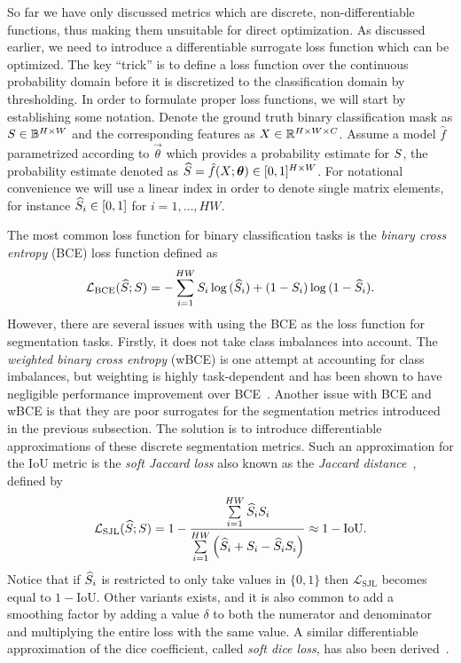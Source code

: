So far we have only discussed metrics which are discrete, non-differentiable functions, thus making them unsuitable for direct optimization.
As discussed earlier, we need to introduce a differentiable surrogate loss function which can be optimized.
The key \enquote{trick} is to define a loss function over the continuous probability domain before it is discretized to the classification domain by thresholding.
In order to formulate proper loss functions, we will start by establishing some notation.
Denote the ground truth binary classification mask as $S \in \mathbb{B}^{H \times W}$ and the corresponding features as $X \in \mathbb{R}^{H \times W \times C}$.
Assume a model $\hat{f}$ parametrized according to $\vec{\theta}$ which provides a probability estimate for $S$, the probability estimate denoted as $\widehat{S} = \hat{f}(X; \boldsymbol{\theta}) \in [0, 1]^{H \times W}$.
For notational convenience we will use a linear index in order to denote single matrix elements, for instance $\widehat{S}_i \in [0, 1]$ for $i = 1, \ldots, HW$.

The most common loss function for binary classification tasks is the \textit{binary cross entropy} (BCE) loss function defined as
%
\begin{equation}
  \mathcal{L}_{\mathrm{BCE}}(\widehat{S}; S)
  =
  - \sum\limits_{i = 1}^{HW}
  S_i \log{(\widehat{S}_i)}
  +
  (1 - S_i) \log{(1 - \widehat{S}_i)}.
  \label{eq:binary-cross-entropy}
\end{equation}
%
However, there are several issues with using the BCE as the loss function for segmentation tasks.
Firstly, it does not take class imbalances into account.
The \textit{weighted binary cross entropy} (wBCE) is one attempt at accounting for class imbalances, but weighting is highly task-dependent and has been shown to have negligible performance improvement over BCE~\cite[p.~98]{soft-losses}.
Another issue with BCE and wBCE is that they are poor surrogates for the segmentation metrics introduced in the previous subsection.
The solution is to introduce differentiable approximations of these discrete segmentation metrics.
Such an approximation for the IoU metric is the \textit{soft Jaccard loss} also known as the \textit{Jaccard distance}~\cite{jaccard-loss-with-equation}, defined by
%
\begin{equation}
  \mathcal{L}_{\mathrm{SJL}}(\predsegraster; \segraster)
  =
  1
  -
  \frac{%
    \sum\limits_{i = 1}^{HW}
    \predsegraster_i \segraster_i
  }{%
    \sum\limits_{i = 1}^{HW} \left(
      \predsegraster_i
      +
      \segraster_i
      -
      \predsegraster_i \segraster_i
    \right)
  }
  \approx
  1 - \mathrm{IoU}.
  \label{eq:soft-jaccard-loss}
\end{equation}
%
Notice that if $\widehat{S}_i$ is restricted to only take values in $\{0, 1\}$ then $\mathcal{L}_{\mathrm{SJL}}$ becomes equal to $1 - \mathrm{IoU}$.
Other variants exists, and it is also common to add a smoothing factor by adding a value $\delta$ to both the numerator and denominator and multiplying the entire loss with the same value.
A similar differentiable approximation of the dice coefficient, called \textit{soft dice loss}, has also been derived~\cite{original-soft-dice-loss}.

